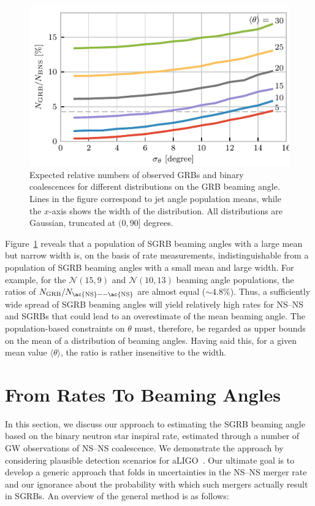 \documentclass[twocolumn]{aastex61}
\newcommand{\BNS}{\ac{NS}--\ac{NS}\xspace}
\begin{document}
\begin{figure}
\centering
\includegraphics[width=\linewidth]{color_relativenumber.pdf}
\caption{\label{fig:thetapopulation} Expected relative numbers of
  observed GRBs and binary coalescences for different distributions on
  the GRB beaming angle.  Lines in the figure correspond to jet angle
  population means, while the $x$-axis shows the width of the
  distribution.  All distributions are Gaussian, truncated at
  $(0, 90]$ degrees.\label{fig:thetapop}}
\end{figure}




Figure~\ref{fig:thetapop} reveals that a population of \ac{SGRB} beaming angles with a large mean but narrow width is, on the basis of rate measurements, indistinguishable from a population of \ac{SGRB} beaming angles with a small mean and large width.
For example, for the ${\mathcal N}(15,9)$ and ${\mathcal N}(10,13)$ beaming angle populations, the ratios of $N_{\mathrm{GRB}}/N_{\mathrm{\BNS}}$ are almost equal ($\sim 4.8\%$).
Thus, a sufficiently wide spread of \ac{SGRB} beaming angles will yield relatively high rates for \BNS and \acp{SGRB} that could lead to an overestimate of the mean beaming angle.
The population-based constraints on $\theta$ must, therefore, be regarded as upper bounds on the mean of a distribution of beaming angles.
Having said this, for a given mean value $\langle \theta \rangle$, the ratio is rather insensitive to the width.


\section{From Rates To Beaming Angles}

In this section, we discuss our approach to estimating the \ac{SGRB} beaming angle based on the binary neutron star inspiral rate, estimated through a number of \ac{GW} observations of \BNS coalescence.
We demonstrate the approach by considering plausible detection scenarios for \ac{aLIGO}~\cite{Aasi:2013wya}.
Our ultimate goal is to develop a generic approach that folds in uncertainties in the \BNS merger rate and our ignorance about the probability with which such mergers actually result in \acp{SGRB}.
%
An overview of the general method is as follows:
\end{document}
